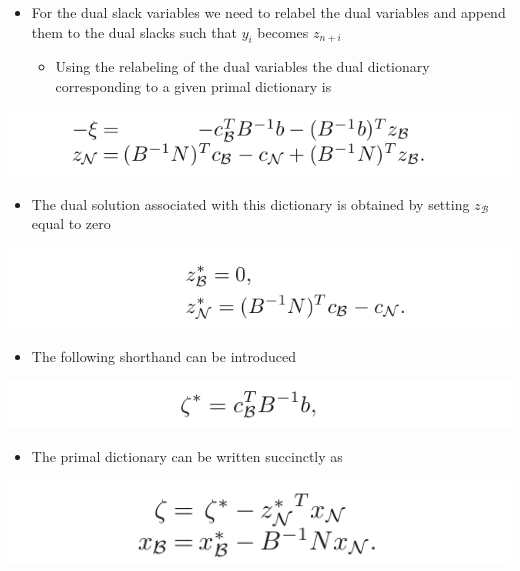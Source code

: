 \documentclass[11pt]{article}
\begin{document}
\begin{itemize}
\item For the dual slack variables we need to relabel the dual variables and append them to the dual slacks such that \(y_i\) becomes \(z_{n+i}\)
\begin{itemize}
\item Using the relabeling of the dual variables the dual dictionary corresponding to a given primal dictionary is
\end{itemize}
\end{itemize}
\begin{center}
\includegraphics[width=.9\linewidth]{The Simplex Method in Matrix Notation/screenshot_2019-02-11_16-40-08.png}
\end{center} 
\begin{itemize}
\item The dual solution associated with this dictionary is obtained by setting \(z_{\mathcal B}\) equal to zero
\end{itemize}
\begin{center}
\includegraphics[width=.9\linewidth]{The Simplex Method in Matrix Notation/screenshot_2019-02-11_16-40-59.png}
\end{center} 
\begin{itemize}
\item The following shorthand can be introduced
\end{itemize}
\begin{center}
\includegraphics[width=.9\linewidth]{The Simplex Method in Matrix Notation/screenshot_2019-02-11_16-44-45.png}
\end{center}
\begin{itemize}
\item The primal dictionary can be written succinctly as
\end{itemize}
\begin{center}
\includegraphics[width=.9\linewidth]{The Simplex Method in Matrix Notation/screenshot_2019-02-11_16-45-20.png}
\end{center}
\end{document}
